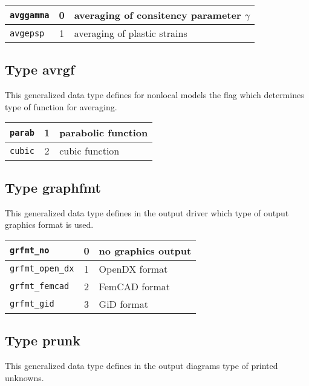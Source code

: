 \begin{center}
\begin{tabular}{|l|c|l|}
\hline
{\tt avggamma} & 0 & averaging of consitency parameter $\gamma$
\\ \hline
{\tt avgepsp} & 1 & averaging of plastic strains
\\ \hline
\end{tabular}
\end{center}

\subsection{Type {\sf avrgf}}
\label{sectavrgf}
This generalized data type defines for nonlocal models the flag which
determines type of function for averaging.

\begin{center}
\begin{tabular}{|l|c|l|}
\hline
{\tt parab} & 1 & parabolic function
\\ \hline
{\tt cubic} & 2 & cubic function
\\ \hline
\end{tabular}
\end{center}

\subsection{Type {\sf graphfmt}}
\label{sectgraphfmt}
This generalized data type defines in the output driver which type of
output graphics format is used.

\begin{center}
\begin{tabular}{|l|c|l|}
\hline
{\tt grfmt\_no} & 0 & no graphics output
\\ \hline
{\tt grfmt\_open\_dx} & 1 & OpenDX format
\\ \hline
{\tt grfmt\_femcad} & 2 & FemCAD format
\\ \hline
{\tt grfmt\_gid} & 3 & GiD format
\\ \hline
\end{tabular}
\end{center}

\subsection{Type {\sf prunk}}
\label{sectprunk}
This generalized data type defines in the output diagrams type of
printed unknowns. 

